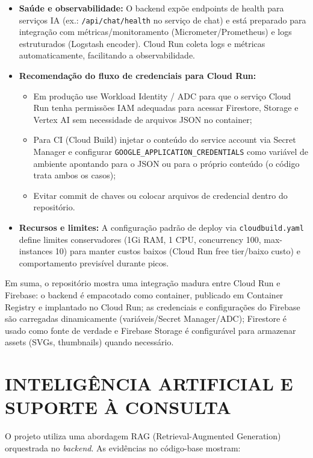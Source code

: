 \begin{itemize}
    \item \textbf{Saúde e observabilidade:} O backend expõe endpoints de health para serviços IA (ex.: \texttt{/api/chat/health} no serviço de chat) e está preparado para integração com métricas/monitoramento (Micrometer/Prometheus) e logs estruturados (Logstash encoder). Cloud Run coleta logs e métricas automaticamente, facilitando a observabilidade.
    \item \textbf{Recomendação do fluxo de credenciais para Cloud Run:}
        \begin{itemize}
            \item Em produção use Workload Identity / ADC para que o serviço Cloud Run tenha permissões IAM adequadas para acessar Firestore, Storage e Vertex AI sem necessidade de arquivos JSON no container;
            \item Para CI (Cloud Build) injetar o conteúdo do service account via Secret Manager e configurar \texttt{GOOGLE\_APPLICATION\_CREDENTIALS} como variável de ambiente apontando para o JSON ou para o próprio conteúdo (o código trata ambos os casos);
            \item Evitar commit de chaves ou colocar arquivos de credencial dentro do repositório.
        \end{itemize}

    \item \textbf{Recursos e limites:} A configuração padrão de deploy via \texttt{cloudbuild.yaml} define limites conservadores (1Gi RAM, 1 CPU, concurrency 100, max-instances 10) para manter custos baixos (Cloud Run free tier/baixo custo) e comportamento previsível durante picos.
\end{itemize}

Em suma, o repositório mostra uma integração madura entre Cloud Run e Firebase: o backend é empacotado como container, publicado em Container Registry e implantado no Cloud Run; as credenciais e configurações do Firebase são carregadas dinamicamente (variáveis/Secret Manager/ADC); Firestore é usado como fonte de verdade e Firebase Storage é configurável para armazenar assets (SVGs, thumbnails) quando necessário.

\section{INTELIGÊNCIA ARTIFICIAL E SUPORTE À CONSULTA} \label{sec:ia}

O projeto utiliza uma abordagem RAG (Retrieval-Augmented Generation) orquestrada no \textit{backend}. As evidências no código-base mostram:

